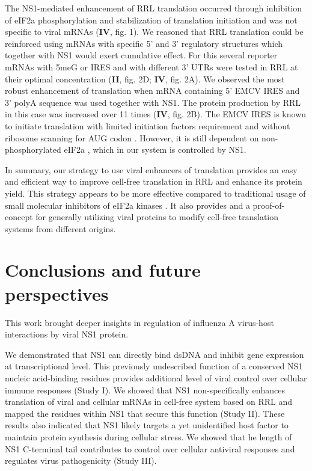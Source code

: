 		The NS1-mediated enhancement of \gls{RRL} translation occurred through inhibition of \gls{eIF2a} phosphorylation and stabilization of translation initiation and was not specific to viral mRNAs (\textbf{IV}, fig. 1). We reasoned that \gls{RRL} translation could be reinforced using mRNAs with specific 5' and 3' regulatory structures which together with \gls{NS1} would exert cumulative effect. For this several reporter mRNAs with \gls{5meG} or \gls{IRES} and with different 3' \gls{UTR}s were tested in RRL at their optimal concentration (\textbf{II}, fig. 2D; \textbf{IV}, fig. 2A). We observed the most robust enhancement of translation when mRNA containing 5' \gls{EMCV} \gls{IRES} and 3' \gls{polyA} sequence was used together with NS1. The protein production by RRL in this case was increased over 11 times (\textbf{IV}, fig. 2B). The \gls{EMCV} \gls{IRES} is known to initiate translation with limited initiation factors requirement and without ribosome scanning for AUG codon \parencite{Pestova2001}. However, it is still dependent on non-phosphorylated \gls{eIF2a} \parencite{Terenin2008}, which in our system is controlled by NS1. 
	
		In summary, our strategy to use viral enhancers of translation provides an easy and efficient way to improve cell-free translation in \gls{RRL} and enhance its protein yield. This strategy appears to be more effective compared to traditional usage of small molecular inhibitors of \gls{eIF2a} kinases \parencite{Jammi2003}. It also provides and a proof-of-concept for generally utilizing viral proteins to modify cell-free translation systems from different origins.
	
\newpage
\section{Conclusions and future perspectives}

	This work brought deeper insights in regulation of influenza A virus-host interactions by viral NS1 protein.
	
	We demonstrated that NS1 can directly bind dsDNA and inhibit gene expression at transcriptional level. This previously undescribed function of a conserved NS1 nucleic acid-binding residues provides additional level of viral control over cellular immune responses (Study I). We showed that NS1 non-specifically enhances translation of viral and cellular mRNAs in cell-free system based on \gls{RRL} and mapped the residues within NS1 that secure this function (Study II). These results also indicated that NS1 likely targets a yet unidentified host factor to maintain protein synthesis during cellular stress. We showed that he length of NS1 C-terminal tail contributes to control over cellular antiviral responses and regulates virus pathogenicity (Study III). 
	
